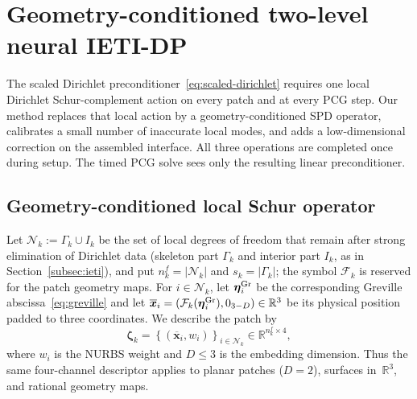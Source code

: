 \documentclass{article}
\newcommand{\vect}[1]{\boldsymbol{#1}}
\newcommand{\R}{\mathbb{R}}
\newcommand{\skel}{\Gamma} %
\newcommand{\gmapk}[1]{\mathcal{F}_{#1}}         %
\newcommand{\dofset}{\mathcal{N}}                %
\theoremstyle{plain}
\numberwithin{equation}{section}
\begin{document}
\section{Geometry-conditioned two-level neural IETI-DP}
\label{sec:method}

The scaled Dirichlet preconditioner~\eqref{eq:scaled-dirichlet} requires one
local Dirichlet Schur-complement action on every patch and at every PCG step.
Our method replaces that local action by a geometry-conditioned SPD
operator, calibrates a small number of inaccurate local modes, and adds a
low-dimensional correction on the assembled interface.  All three operations
are completed once during setup.  The timed PCG solve sees only the resulting
linear preconditioner.
\subsection{Geometry-conditioned local Schur operator}
\label{subsec:local-model}

Let $\dofset_k := \skel_k \cup I_k$ be the set of local degrees of freedom that
remain after strong elimination of Dirichlet data (skeleton part $\skel_k$ and
interior part $I_k$, as in Section~\ref{subsec:ieti}), and put
$n_k^f=|\dofset_k|$ and $s_k=|\skel_k|$; the symbol $\gmapk{k}$ is reserved for
the patch geometry maps.
For $i\in\dofset_k$, let $\vect\eta_i^{\rm Gr}$ be the corresponding
Greville abscissa~\eqref{eq:greville} and let
$\overline{\vect x}_i=(\gmapk{k}(\vect\eta_i^{\rm Gr}),0_{3-D})\in\R^3$
be its physical position padded to three coordinates.  We describe the patch by
\begin{equation}
    \vect\zeta_k=
    \left\{\left(\overline{\vect x}_i,w_i\right)
    \right\}_{i\in\dofset_k}\in\R^{n_k^f\times4},
    \label{eq:journal-geometry-descriptor}
\end{equation}
where $w_i$ is the NURBS weight and $D\le3$ is the embedding dimension.  Thus the
same four-channel descriptor applies to planar patches ($D=2$), surfaces in~$\R^3$, and
rational geometry maps.
\end{document}
